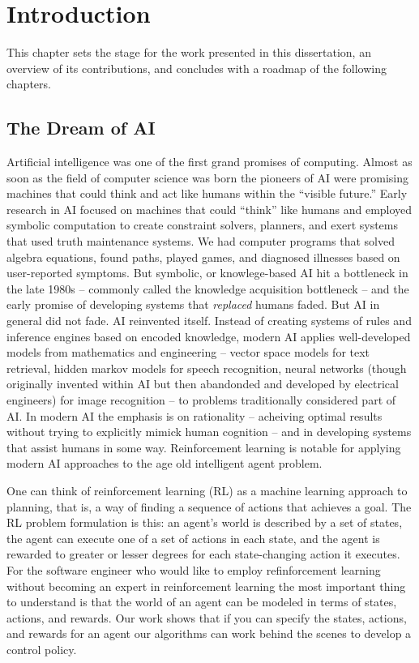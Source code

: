 \chapter{Introduction}

This chapter sets the stage for the work presented in this dissertation, an overview of its contributions, and concludes with a roadmap of the following chapters.

\section{The Dream of AI}

Artificial intelligence was one of the first grand promises of computing. Almost as soon as the field of computer science was born the pioneers of AI were promising machines that could think and act like humans within the ``visible future.'' Early research in AI focused on machines that could ``think'' like humans and employed symbolic computation to create constraint solvers, planners, and exert systems that used truth maintenance systems. We had computer programs that solved algebra equations, found paths, played games, and diagnosed illnesses based on user-reported symptoms. But symbolic, or knowlege-based AI hit a bottleneck in the late 1980s -- commonly called the knowledge acquisition bottleneck -- and the early promise of developing systems that {\it replaced} humans faded. But AI in general did not fade. AI reinvented itself. Instead of creating systems of rules and inference engines based on encoded knowledge, modern AI applies well-developed models from mathematics and engineering -- vector space models for text retrieval, hidden markov models for speech recognition, neural networks (though originally invented within AI but then abandonded and developed by electrical engineers) for image recognition -- to problems traditionally considered part of AI. In modern AI the emphasis is on rationality -- acheiving optimal results without trying to explicitly mimick human cognition -- and in developing systems that assist humans in some way. Reinforcement learning is notable for applying modern AI approaches to the age old intelligent agent problem.

One can think of reinforcement learning (RL) as a machine learning approach to planning, that is, a way of finding a sequence of actions that achieves a goal.  The RL problem formulation is this: an agent's world is described by a set of states, the agent can execute one of a set of actions in each state, and the agent is rewarded to greater or lesser degrees for each state-changing action it executes. For the software engineer who would like to employ refinforcement learning without becoming an expert in reinforcement learning the most important thing to understand is that the world of an agent can be modeled in terms of states, actions, and rewards. Our work shows that if you can specify the states, actions, and rewards for an agent our algorithms can work behind the scenes to develop a control policy.

